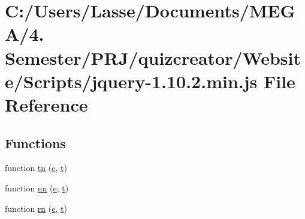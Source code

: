 \hypertarget{_scripts_2jquery-1_810_82_8min_8js}{}\section{C\+:/\+Users/\+Lasse/\+Documents/\+M\+E\+G\+A/4. Semester/\+P\+R\+J/quizcreator/\+Website/\+Scripts/jquery-\/1.10.2.min.\+js File Reference}
\label{_scripts_2jquery-1_810_82_8min_8js}
\subsection*{Functions}
\begin{DoxyCompactItemize}
\item 
function \hyperlink{_scripts_2jquery-1_810_82_8min_8js_a9372ffea5788fa8dc44b8fc18aba3118}{tn} (\hyperlink{jquery_8unobtrusive-ajax_8min_8js_a1bbdb559c9d41205c42f84b233650eb3}{e}, \hyperlink{_scripts_2jquery_8validate_8min_8js_a23c5666e83bbbceee94adcd0851f50c4}{t})
\item 
function \hyperlink{_scripts_2jquery-1_810_82_8min_8js_a11655b827ec323fed5b6a764f93b9ece}{nn} (\hyperlink{jquery_8unobtrusive-ajax_8min_8js_a1bbdb559c9d41205c42f84b233650eb3}{e}, \hyperlink{_scripts_2jquery_8validate_8min_8js_a23c5666e83bbbceee94adcd0851f50c4}{t})
\item 
function \hyperlink{_scripts_2jquery-1_810_82_8min_8js_a683a60c6ff4ff96a79f34e54fc8cc972}{rn} (\hyperlink{jquery_8unobtrusive-ajax_8min_8js_a1bbdb559c9d41205c42f84b233650eb3}{e}, \hyperlink{_scripts_2jquery_8validate_8min_8js_a23c5666e83bbbceee94adcd0851f50c4}{t})
\item 

\end{DoxyCompactItemize}

